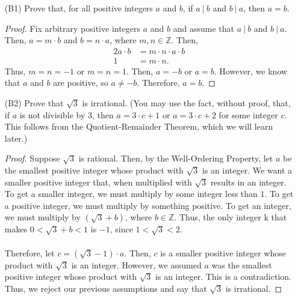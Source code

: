 \documentclass{article}
\begin{document}
\begin{itemize}

	\item [(B1)] Prove that, for all positive integers $a$ and $b$, if $a \ |\ b$ and $b \ |\ a$, then $a = b$.
            \begin{proof}
                Fix arbitrary positive integers $a$ and $b$ and assume that $a \ |\ b$ and $b \ |\ a$. Then, $a = m \cdot b$ and $b = n \cdot a$, where $m, n \in \mathbb{Z}$. Then, 
                \begin{alignat*}{2}
                    a\cdot b &= m\cdot n\cdot a\cdot b \\
                    1 &= m\cdot n.
                \end{alignat*}
                Thus, $m = n = -1$ or $m = n = 1$. Then, $a = \minus b$ or $a = b$. However, we know that $a$ and $b$ are positive, so $a \ne \minus b$. Therefore, $a = b$.
            \end{proof}

	\item [(B2)] Prove that $\sqrt{3}$ is irrational.  (You may use the fact, without proof, that, if $a$ is not divisible by $3$, then $a = 3 \cdot c + 1$ or $a = 3 \cdot c + 2$ for some integer $c$.  This follows from the Quotient-Remainder Theorem, which we will learn later.)
            \begin{proof}
                Suppose $\sqrt{3}$ is rational. Then, by the Well-Ordering Property, let $a$ be the smallest positive integer whose product with $\sqrt{3}$ is an integer. We want a smaller positive integer that, when multiplied with $\sqrt{3}$ results in an integer. To get a smaller integer, we must multiply by some integer less than $1$. To get a positive integer, we must multiply by something positive. To get an integer, we must multiply by $(\sqrt{3} + b)$, where $b\in \mathbb{Z}$. Thus, the only integer k that makes $0 < \sqrt{3} + b < 1$ is $\minus 1$, since $1 < \sqrt{3} < 2$.\\\\
                Therefore, let $c = (\sqrt{3} - 1)\cdot a$. Then, $c$ is a smaller positive integer whose product with $\sqrt{3}$ is an integer. However, we assumed $a$ was the smallest positive integer whose product with $\sqrt{3}$ is an integer. This is a contradiction. Thus, we reject our previous assumptions and say that $\sqrt{3}$ is irrational. 
            \end{proof}
    \end{itemize}
\end{document}
